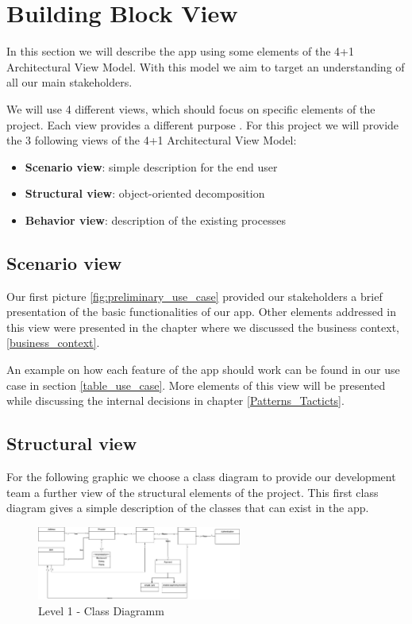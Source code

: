 \section{Building Block View}

In this section we will describe the \gls{app} using some elements of the 4+1 Architectural View Model. With this model we
aim to target an understanding of all our main stakeholders.

We will use 4 different views, which should focus on specific elements of the project. Each view provides a different
purpose \cite{refart:KR41}. For this project we will provide the 3 following views of the 4+1 Architectural View 
Model:

\begin{itemize}
    \item \textbf{Scenario view}: simple description for the end user 
    \item \textbf{Structural view}: object-oriented decomposition
    \item \textbf{Behavior view}: description of the existing processes
\end{itemize}

\subsection{Scenario view}

Our first picture \ref{fig:preliminary_use_case} provided our stakeholders a brief presentation of the basic functionalities of our app. Other elements addressed in this view were presented in the chapter where we discussed the business context, \ref{business_context}. 

An example on how each feature of the app should work can be found in our use case in section \ref{table_use_case}.
More elements of this view will be presented while discussing the internal decisions in chapter \ref{Patterns_Tacticts}. 

\subsection{Structural view}

For the following graphic we choose a \gls{class diagram} to provide our development team a further view of the
structural elements of the project. This first class diagram gives a simple description of the classes that can
exist in the app.

\begin{figure}[H]
    \centering
    \includegraphics[width=0.6\textwidth]{assets/simple_classes_CD.jpg}
    \caption{Level 1 - Class Diagramm}
    \label{fig:simple_class_diagram}
\end{figure}

